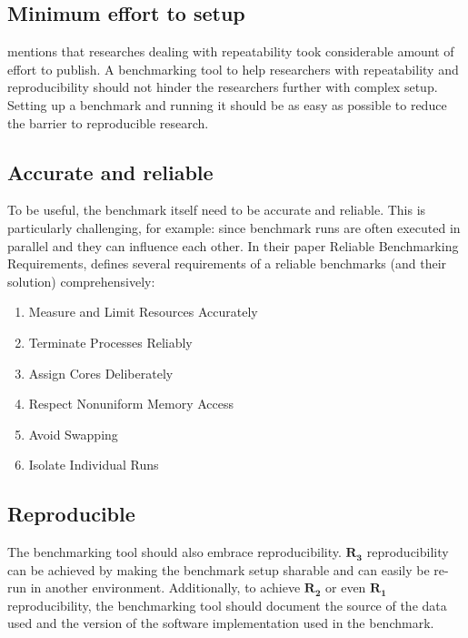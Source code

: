 \subsection{Minimum effort to setup}
\citet{vitekR3RepeatabilityReproducibility2012} mentions that researches dealing with repeatability took considerable amount of effort to publish.
A benchmarking tool to help researchers with repeatability and reproducibility should not hinder the researchers further with complex setup.
Setting up a benchmark and running it should be as easy as possible to reduce the barrier to reproducible research.

\subsection{Accurate and reliable}
To be useful, the benchmark itself need to be accurate and reliable.
This is particularly challenging, for example: since benchmark runs are often executed in parallel and they can influence each other.
In their paper Reliable Benchmarking Requirements, \citet{beyerReliableBenchmarkingRequirements2019} defines several requirements of a reliable benchmarks (and their solution) comprehensively:
\begin{enumerate}[noitemsep]
	\item Measure and Limit Resources Accurately
	\item Terminate Processes Reliably
	\item Assign Cores Deliberately
	\item Respect Nonuniform Memory Access
	\item Avoid Swapping
	\item Isolate Individual Runs
\end{enumerate}

\subsection{Reproducible}
The benchmarking tool should also embrace reproducibility.
$\bm{R_3}$ reproducibility can be achieved by making the benchmark setup sharable and can easily be re-run in another environment.
Additionally, to achieve $\bm{R_2}$ or even $\bm{R_1}$ reproducibility, the benchmarking tool should document the source of the data used and the version of the software implementation used in the benchmark.
